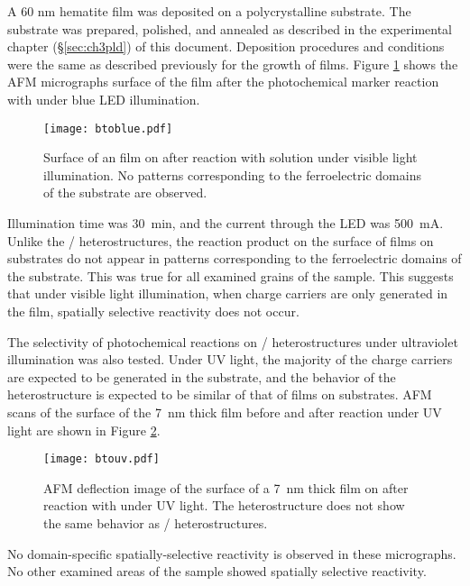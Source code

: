 A 60 nm hematite film was deposited on a polycrystalline  substrate. The substrate was prepared, polished, and annealed as described in the experimental chapter (\S \ref{sec:ch3pld}) of this document. Deposition procedures and conditions were the same as described previously for the growth of  films. Figure \ref{fig:btoblue} shows the AFM micrographs surface of the film after the photochemical marker reaction with  under blue LED illumination. 
\begin{figure}[htbp]
\begin{center}
\texttt{[image: btoblue.pdf]}
\caption[Surface of an  film on  after reaction]{Surface of an  film on  after reaction with  solution under visible light illumination. No patterns corresponding to the ferroelectric domains of the substrate are observed.}
\label{fig:btoblue} %
\end{center}
\end{figure}
Illumination time was \SI{30}{\minute}, and the current through the LED was \SI{500}{\milli\ampere}. Unlike the / heterostructures, the reaction product on the surface of  films on  substrates do not appear in patterns corresponding to the ferroelectric domains of the substrate. This was true for all examined grains of the sample. This suggests that under visible light illumination, when charge carriers are only generated in the film, spatially selective reactivity does not occur.

The selectivity of photochemical reactions on / heterostructures under ultraviolet illumination was also tested. Under UV light, the majority of the charge carriers are expected to be generated in the substrate, and the behavior of the heterostructure is expected to be similar of that of  films on  substrates. AFM scans of the surface of the \SI{7}{\nano\meter} thick film before and after reaction under UV light are shown in Figure \ref{fig:btouv}.
\begin{figure}[htbp]
\begin{center}
\texttt{[image: btouv.pdf]}
\caption[AFM deflection image reaction on \SI{7}{\nano\meter} thick  film]{AFM deflection image of the surface of a \SI{7}{\nano\meter} thick  film on  after reaction with  under UV light. The heterostructure does not show the same behavior as / heterostructures.}
\label{fig:btouv} %
\end{center}
\end{figure}
No domain-specific spatially-selective reactivity is observed in these micrographs. No other examined areas of the sample showed spatially selective reactivity.

